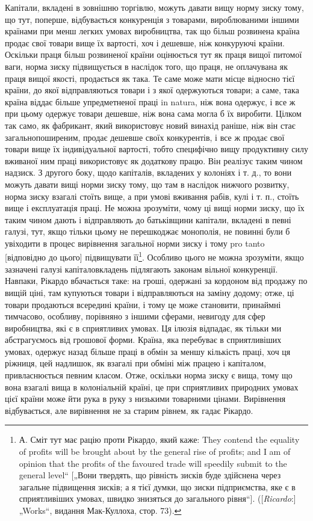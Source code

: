 Капітали, вкладені в зовнішню торгівлю, можуть давати вищу норму зиску тому, що тут, поперше,
відбувається конкуренція з товарами, вироблюваними іншими країнами при менш легких умовах
виробництва, так що більш розвинена країна продає свої
товари вище їх вартості, хоч і дешевше, ніж конкуруючі країни. Оскільки праця більш розвиненої
країни оцінюється тут як праця вищої питомої ваги, норма зиску підвищується в наслідок того, що
праця, не оплачувана як праця вищої якості, продається як така. Те саме може мати місце відносно
тієї країни, до якої відправляються товари і з якої одержуються товари; а саме, така країна віддає
більше упредметненої праці in natura, ніж вона одержує, і все ж при цьому одержує товари дешевше,
ніж вона сама могла б їх виробити. Цілком так само, як фабрикант,
який використовує новий винахід раніше, ніж він стає загальнопоширеним, продає дешевше своїх
конкурентів, і все ж продає свої товари вище їх індивідуальної вартості, тобто специфічно вищу
продуктивну силу вживаної ним праці використовує як додаткову працю. Він реалізує таким чином
надзиск. З другого боку, щодо капіталів, вкладених у колоніях і т. д., то вони можуть давати вищі
норми зиску тому, що там в наслідок нижчого розвитку, норма зиску взагалі стоїть вище, а при умові
вживання рабів, кулі і т. п., стоїть вище і експлуатація праці. Не можна зрозуміти, чому ці вищі
норми зиску, що їх таким чином дають і відправляють до батьківщини капітали, вкладені в певні
галузі, тут, якщо тільки цьому не перешкоджає монополія, не повинні були б увіходити в процес
вирівнення загальної норми зиску і тому pro tanto [відповідно до цього] підвищувати її\footnote{
А. Сміт тут має рацію проти Рікардо, який каже: They contend the equality of profits will be
brought about by the general rise of profits; and I am of opinion that the profits of the favoured
trade will speedily submit to the general level“ [„Вони твердять, що рівність зисків буде здійснена
через загальне підвищення зисків; а я тієї думки, що зиски підприємства, яке є в сприятливіших
умовах, швидко знизяться до загального рівня“]. ([\emph{Ricardo}:] „Works“, видання Мак-Куллоха, стор. 73).
}. Особливо
цього не можна зрозуміти, якщо зазначені
галузі капіталовкладень підлягають законам вільної конкуренції. Навпаки, Рікардо вбачається
таке: на гроші, одержані за кордоном від продажу по вищій ціні, там купуються товари і
відправляються на заміну додому; отже, ці товари продаються
всередині країни, і тому це може становити, принаймні тимчасово, особливу, порівняно з іншими
сферами, невигоду для сфер виробництва, які є в сприятливих умовах. Ця ілюзія відпадає, як тільки ми
абстрагуємось від грошової форми. Країна,
яка перебуває в сприятливіших умовах, одержує назад більше праці в обмін за меншу кількість праці,
хоч ця ріжниця, цей надлишок, як взагалі при обміні між працею і капіталом, привласнюється певним
класом. Отже, оскільки норма зиску є вища, тому
що вона взагалі вища в колоніальній країні, це при сприятливих природних умовах цієї країни може йти
рука в руку з низькими товарними цінами. Вирівнення відбувається, але вирівнення не за старим
рівнем, як гадає Рікардо.

